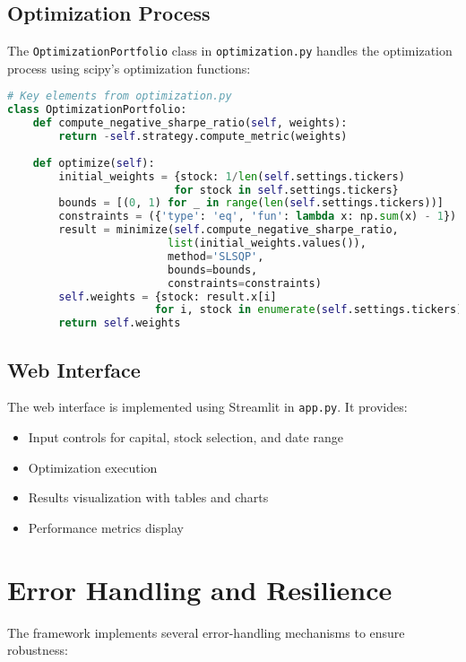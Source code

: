 \documentclass[11pt,a4paper]{article}
\begin{document}
\subsection{Optimization Process}

The \texttt{OptimizationPortfolio} class in \texttt{optimization.py} handles the optimization process using scipy's optimization functions:

\begin{lstlisting}[language=Python]
# Key elements from optimization.py
class OptimizationPortfolio:
    def compute_negative_sharpe_ratio(self, weights):
        return -self.strategy.compute_metric(weights)
    
    def optimize(self):
        initial_weights = {stock: 1/len(self.settings.tickers) 
                          for stock in self.settings.tickers}
        bounds = [(0, 1) for _ in range(len(self.settings.tickers))]
        constraints = ({'type': 'eq', 'fun': lambda x: np.sum(x) - 1})
        result = minimize(self.compute_negative_sharpe_ratio, 
                         list(initial_weights.values()), 
                         method='SLSQP', 
                         bounds=bounds, 
                         constraints=constraints)
        self.weights = {stock: result.x[i] 
                       for i, stock in enumerate(self.settings.tickers)}
        return self.weights
\end{lstlisting}

\subsection{Web Interface}

The web interface is implemented using Streamlit in \texttt{app.py}. It provides:

\begin{itemize}
    \item Input controls for capital, stock selection, and date range
    \item Optimization execution
    \item Results visualization with tables and charts
    \item Performance metrics display
\end{itemize}

\section{Error Handling and Resilience}

The framework implements several error-handling mechanisms to ensure robustness:
\end{document}
